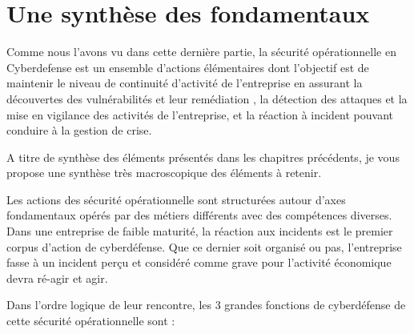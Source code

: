 

\section{Une synthèse des  fondamentaux}
Comme nous l'avons vu dans cette dernière partie,  la sécurité opérationnelle en Cyberdefense est un ensemble d'actions  élémentaires dont l'objectif est  de maintenir le niveau de continuité d'activité de l'entreprise en assurant la découvertes des vulnérabilités et leur remédiation , la détection des attaques et la mise en vigilance des activités de l'entreprise, et la réaction à incident pouvant conduire à la gestion de crise.

A titre de synthèse des éléments présentés dans les chapitres précédents, je vous propose une synthèse très macroscopique des éléments à retenir.

Les actions des sécurité opérationnelle sont structurées autour d'axes  fondamentaux opérés par des métiers différents avec des compétences diverses. Dans une entreprise de faible maturité, la réaction aux incidents est le premier corpus d'action de cyberdéfense. Que ce dernier soit organisé ou pas, l'entreprise fasse à un incident perçu et considéré comme grave pour l'activité économique devra ré-agir et agir.

Dans l'ordre logique de leur rencontre, les 3 grandes fonctions de cyberdéfense de cette sécurité opérationnelle sont  :


